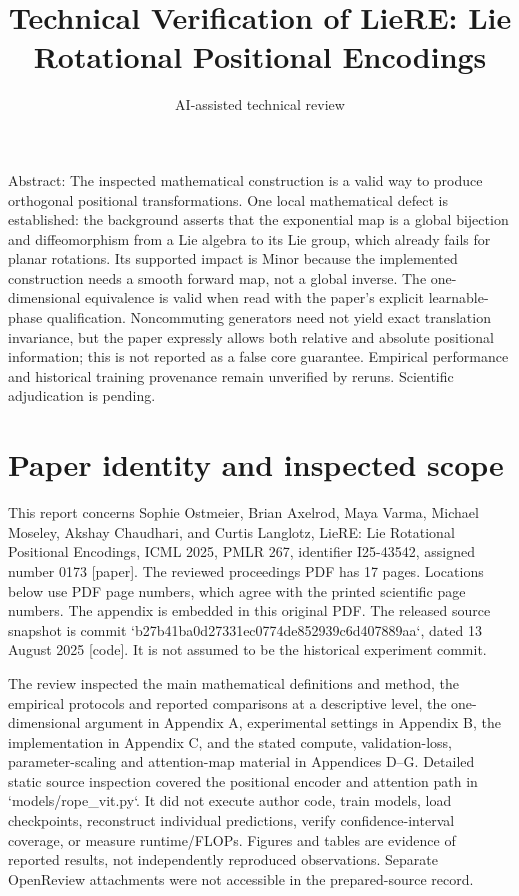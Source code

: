 \documentclass[10pt]{article}
\title{Technical Verification of
LieRE: Lie Rotational Positional Encodings}
\author{AI-assisted technical review}
\date{}
\begin{document}
\maketitle
Abstract: The inspected mathematical construction is a valid way to produce orthogonal positional transformations. One local mathematical defect is established: the background asserts that the exponential map is a global bijection and diffeomorphism from a Lie algebra to its Lie group, which already fails for planar rotations. Its supported impact is Minor because the implemented construction needs a smooth forward map, not a global inverse. The one-dimensional equivalence is valid when read with the paper’s explicit learnable-phase qualification. Noncommuting generators need not yield exact translation invariance, but the paper expressly allows both relative and absolute positional information; this is not reported as a false core guarantee. Empirical performance and historical training provenance remain unverified by reruns. Scientific adjudication is pending.\par
\section*{Paper identity and inspected scope}
This report concerns Sophie Ostmeier, Brian Axelrod, Maya Varma, Michael Moseley, Akshay Chaudhari, and Curtis Langlotz, LieRE: Lie Rotational Positional Encodings, ICML 2025, PMLR 267, identifier I25-43542, assigned number 0173 [paper]. The reviewed proceedings PDF has 17 pages. Locations below use PDF page numbers, which agree with the printed scientific page numbers. The appendix is embedded in this original PDF. The released source snapshot is commit `b27b41ba0d27331ec0774de852939c6d407889aa`, dated 13 August 2025 [code]. It is not assumed to be the historical experiment commit.\par
The review inspected the main mathematical definitions and method, the empirical protocols and reported comparisons at a descriptive level, the one-dimensional argument in Appendix A, experimental settings in Appendix B, the implementation in Appendix C, and the stated compute, validation-loss, parameter-scaling and attention-map material in Appendices D–G. Detailed static source inspection covered the positional encoder and attention path in `models/rope\_vit.py`. It did not execute author code, train models, load checkpoints, reconstruct individual predictions, verify confidence-interval coverage, or measure runtime/FLOPs. Figures and tables are evidence of reported results, not independently reproduced observations. Separate OpenReview attachments were not accessible in the prepared-source record.\par
\end{document}
